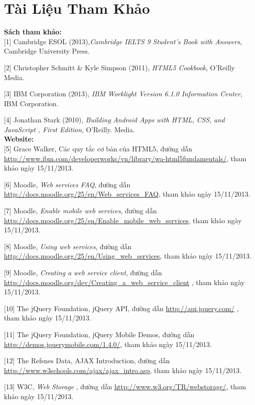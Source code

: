 \chapter{Tài Liệu Tham Khảo}

\textbf{Sách tham khảo:}\\

[1] Cambridge ESOL (2013),\textit{Cambridge IELTS 9 Student's Book with Answers}, Cambridge University Press.

[2] Christopher Schmitt \& Kyle Simpson (2011), \textit{HTML5 Cookbook}, O'Reilly Media.

[3] IBM Corporation (2013), \textit{IBM Worklight Version 6.1.0 Information Center}, IBM Corporation. 

[4] Jonathan Stark (2010), \textit{Building Android Apps with HTML, CSS, and JavaScript , First Edition}, O'Reilly. Media.\\



\textbf{Website:}\\

[5] Grace Walker, Các quy tắc cơ bản của HTML5, đường dẫn \url{http://www.ibm.com/developerworks/vn/library/wa-html5fundamentals/}, tham khảo ngày 15/11/2013.

[6] Moodle, \textit{Web services FAQ}, đường dẫn \url{http://docs.moodle.org/25/en/Web_services_FAQ}, tham khảo ngày 15/11/2013.

[7] Moodle, \textit{Enable mobile web services}, đường dẫn \url{http://docs.moodle.org/25/en/Enable_mobile_web_services}, tham khảo ngày 15/11/2013.

[8] Moodle, \textit{Using web services}, đường dẫn \url{http://docs.moodle.org/25/en/Using_web_services}, tham khảo ngày 15/11/2013.

[9] Moodle, \textit{Creating a web service client}, đường dẫn \url{http://docs.moodle.org/dev/Creating_a_web_service_client} , tham khảo ngày 15/11/2013.

[10] The jQuery Foundation, jQuery API, đường dẫn \url{http://api.jquery.com/} , tham khảo ngày 15/11/2013.
  
[11] The jQuery Foundation, jQuery Mobile Demos, đường dẫn  \url{http://demos.jquerymobile.com/1.4.0/}, tham khảo ngày 15/11/2013.

[12] The Refsnes Data, AJAX Introduction, đường dẫn \url{http://www.w3schools.com/ajax/ajax_intro.asp}, tham khảo ngày 15/11/2013.

[13] W3C, \textit{Web Storage} , đường dẫn \url{http://www.w3.org/TR/webstorage/}, tham khảo ngày 15/11/2013.

